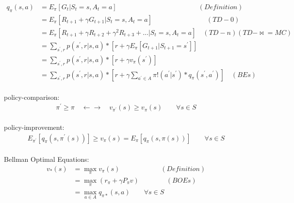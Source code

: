 \documentclass{article}
\begin{document}
\begin{align*}
    q_{\pi}(s, a) 
      &= E_{\pi} \left[ G_{t} | S_{t}=s, A_{t}=a \right] 
      \qquad \qquad \qquad \qquad \qquad \qquad (Definition) \\[3pt]
      &= E_{\pi} \left[ R_{t+1} + \gamma G_{t+1} 
         | S_{t}=s, A_{t}=a \right] 
         \qquad \qquad \qquad \qquad (TD-0) \\[3pt]
      &= E_{\pi} \left[ R_{t+1} + \gamma R_{t+2} + \gamma^2 R_{t+3} + ... 
         | S_{t}=s, A_{t}=a \right] 
         \quad (TD-n)(TD-\Join =MC) \\[3pt]
      &= \sum_{s^{\prime}, r} 
         p \left( s^{\prime}, r | s, a \right) * 
         \left[ r + \gamma E_{\pi} 
         \left[ G_{t+1} | S_{t+1}=s^{\prime} \right] \right] \\[3pt]
      &= \sum_{s^{\prime}, r} 
         p \left( s^{\prime}, r | s, a \right) * 
         \left[ r + \gamma 
         v_{\pi} \left( s^{\prime} \right) \right] \\[3pt]
      &= \sum_{s^{\prime}, r} 
         p \left( s^{\prime}, r | s, a \right) * 
         \left[ r + \gamma 
         \sum_{a^{\prime} \in A} 
         \pi ! \left( a^{\prime} | s^{\prime} \right) * 
         q_{\pi} \left( s^{\prime}, a^{\prime} \right) \right] 
         \quad (BEs) \\[3pt]
\end{align*}


\newpage


policy-comparison: 
\begin{align*}
    \pi^{\prime} \geq \pi 
    \quad \leftarrow \rightarrow \quad 
    v_{\pi^{\prime}}(s) \geq v_{\pi}(s) 
    \qquad \forall s \in S 
\end{align*}
\\[3pt]


policy-improvement: 
\begin{align*}
    E_{\pi^{\prime}} 
    \left[ q_{\pi} \left( s, \pi^{\prime}(s) \right) \right] 
    \geq v_{\pi}(s) 
    = E_{\pi} \left[ q_{\pi} \left( s, \pi(s) \right) \right] 
    \qquad \forall s \in S 
\end{align*}
\\[3pt]


Bellman Optimal Equations: 
\begin{align*}
    v_{*}(s) 
    & = \max_{\pi} v_{\pi}(s) 
        \qquad \qquad \qquad (Definition) \\[3pt]
    & = \max_{\pi} \left( r_{\pi} + \gamma P_{\pi} v \right) 
        \qquad \qquad (BOEs) \\[3pt]
    & = \max_{a \in A} q_{\pi *}(s, a) 
        \qquad \forall s \in S \\[3pt]
\end{align*}
\\[3pt]
\end{document}
